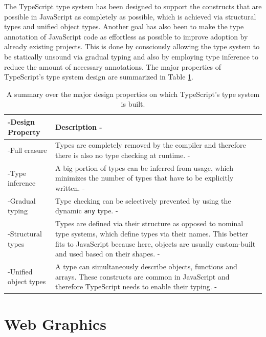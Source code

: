 The TypeScript type system has been designed to support the constructs that are possible in JavaScript as completely as possible, which is achieved via structural types and unified object types. 
Another goal has also been to make the type annotation of JavaScript code as effortless as possible to improve adoption by already existing projects. 
This is done by consciously allowing the type system to be statically unsound via gradual typing and also by employing type inference to reduce the amount of necessary annotations. 
The major properties of TypeScript's type system design are summarized in Table \ref{tab:TSTypeSystemDesignProperties}.

\begin{table}[tp]
\tablestretch
{}
\centering
\begin{tabularx}{\linewidth}{>{\kern-\tabcolsep}lX<{\kern-\tabcolsep}}
\toprule
Design Property & Description \\
\midrule
Full erasure         & Types are completely removed by the compiler and therefore there is also no type checking at runtime. \\
Type inference       & A big portion of types can be inferred from usage, which minimizes the number of types that have to be explicitly written. \\
Gradual typing       & Type checking can be selectively prevented by using the dynamic \lstinline{any} type. \\
Structural types     & Types are defined via their structure as opposed to nominal type systems, which define types via their names. This better fits to JavaScript because here, objects are usually custom-built and used based on their shapes. \\
Unified object types & A type can simultaneously describe objects, functions and arrays. These constructs are common in JavaScript and therefore TypeScript needs to enable their typing. \\
\bottomrule
\end{tabularx}
\caption[TypeScript Type System Design Properties]{
  A summary over the major design properties on which TypeScript's type system is built.
}
\label{tab:TSTypeSystemDesignProperties}
\end{table}

\section{Web Graphics}
\label{sec:WebGraphics}

